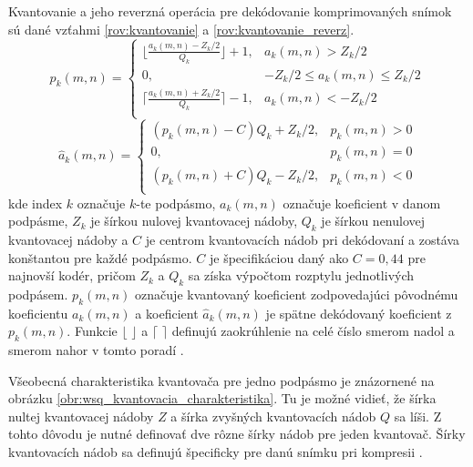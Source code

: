   Kvantovanie a jeho reverzná operácia pre dekódovanie komprimovaných snímok sú dané vzťahmi \ref{rov:kvantovanie} a \ref{rov:kvantovanie_reverz}.
  \begin{equation}
    p_k(m,n) =
    \begin{cases}
      \lfloor \frac{a_k(m,n) - Z_k / 2 }{Q_k} \rfloor + 1, & a_k(m,n) > Z_k/2 \\
      0, & -Z_k/2 \leq a_k(m,n) \leq Z_k/2 \\
      \lceil \frac{a_k(m,n) + Z_k / 2 }{Q_k} \rceil - 1, & a_k(m,n) < -Z_k/2 \\
    \end{cases}
    \label{rov:kvantovanie}
  \end{equation}
  \begin{equation}
    \hat{a}_k(m,n) = 
    \begin{cases}
      (p_k(m,n) - C)Q_k + Z_k/2, & p_k(m,n) > 0 \\
      0, & p_k(m,n) = 0 \\
      (p_k(m,n) + C)Q_k - Z_k/2, & p_k(m,n) < 0\\
    \end{cases}
    \label{rov:kvantovanie_reverz}
  \end{equation}
  kde index $k$ označuje $k$-te podpásmo, $a_k(m,n)$ označuje koeficient v danom podpásme, $Z_k$ je šírkou nulovej kvantovacej nádoby,
  $Q_k$ je šírkou nenulovej kvantovacej nádoby a $C$ je centrom kvantovacích nádob pri dekódovaní a zostáva konštantou pre každé podpásmo. $C$ je špecifikáciou
  daný ako $C = 0,44$ pre najnovší kodér, pričom $Z_k$ a $Q_k$ sa získa výpočtom rozptylu jednotlivých podpásem. $p_k(m,n)$ označuje kvantovaný koeficient
  zodpovedajúci pôvodnému koeficientu $a_k(m,n)$ a koeficient $\hat{a}_k(m,n)$ je spätne dekódovaný koeficient z $p_k(m,n)$. Funkcie $\lfloor$ $\rfloor$
  a $\lceil$ $\rceil$ definujú zaokrúhlenie na celé číslo smerom nadol a smerom nahor v tomto poradí \cite{WSQSpecification}.

  Všeobecná charakteristika kvantovača pre jedno podpásmo je znázornené na obrázku \ref{obr:wsq_kvantovacia_charakteristika}. Tu je možné vidieť, že šírka
  nultej kvantovacej nádoby $Z$ a šírka zvyšných kvantovacích nádob $Q$ sa líši. Z tohto dôvodu je nutné definovať dve rôzne šírky nádob pre jeden kvantovač.
  Šírky kvantovacích nádob sa definujú špecificky pre danú snímku pri kompresii \cite{brislawn1996compression}.

